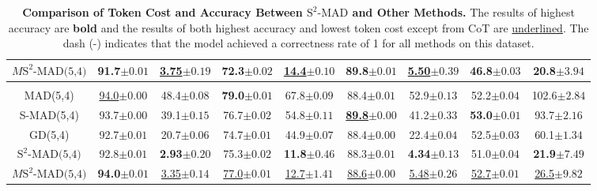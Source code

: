 \begin{table*}[t]
{\begin{tabular}{ccccccccc}
    \({M\text{S}^2\text{-MAD(5,4)}}\) & \textbf{91.7}\scriptsize{$\pm 0.01$} & \underline{3.75}\scriptsize{$\pm 0.19$}          & \textbf{72.3}\scriptsize{$\pm 0.02$} & \underline{14.4}\scriptsize{$\pm 0.10$}         & \textbf{89.8}\scriptsize{$\pm 0.01$} & \underline{5.50}\scriptsize{$\pm 0.39$}                & \textbf{46.8}\scriptsize{$\pm 0.03$} & \textbf{20.8}\scriptsize{$\pm 3.94$} \\
    \midrule
    \rowcolor{Gray}
    \multicolumn{9}{c}{\texttt{GPT-4o-0806}} 
    \\
    \midrule
    MAD(5,4)                 & \underline{94.0}\scriptsize{$\pm 0.00$} & 48.4\scriptsize{$\pm 0.08$}          & \textbf{79.0}\scriptsize{$\pm 0.01$} & 67.8\scriptsize{$\pm 0.09$}        & 88.4\scriptsize{$\pm 0.01$} & 52.9\scriptsize{$\pm 0.13$}                & 52.2\scriptsize{$\pm 0.04$} & 102.6\scriptsize{$\pm 2.84$}                    \\ 
    S-MAD(5,4)                 & 93.7\scriptsize{$\pm 0.00$} & 39.1\scriptsize{$\pm 0.15$}          & 76.7\scriptsize{$\pm 0.02$}  & 54.8\scriptsize{$\pm 0.11$}        & \underline{\textbf{89.8}}\scriptsize{$\pm 0.00$} & 41.2\scriptsize{$\pm 0.33$}                 & \textbf{53.0}\scriptsize{$\pm 0.01$} & 93.7\scriptsize{$\pm 2.16$}                    \\ 
    GD(5,4)                  & 92.7\scriptsize{$\pm 0.01$} & 20.7\scriptsize{$\pm 0.06$}           & 74.7\scriptsize{$\pm 0.01$} & 44.9\scriptsize{$\pm 0.07$}         & 88.4\scriptsize{$\pm 0.00$} & 22.4\scriptsize{$\pm 0.04$}                & 52.5\scriptsize{$\pm 0.03$} & 60.1\scriptsize{$\pm 1.34$}
     \\
    \({\text{S}^2\text{-MAD(5,4)}}\)                  & 92.8\scriptsize{$\pm 0.01$} & \textbf{2.93}\scriptsize{$\pm 0.20$}          & 75.3\scriptsize{$\pm 0.02$} & \textbf{11.8}\scriptsize{$\pm 0.46$}         & 88.3\scriptsize{$\pm 0.01$} & \textbf{4.34}\scriptsize{$\pm 0.13$}                & 51.0\scriptsize{$\pm 0.04$} & \textbf{21.9}\scriptsize{$\pm 7.49$}                 \\
    \({M\text{S}^2\text{-MAD(5,4)}}\) & \textbf{94.0}\scriptsize{$\pm 0.01$} & \underline{3.35}\scriptsize{$\pm 0.14$}          & \underline{77.0}\scriptsize{$\pm 0.01$} & \underline{12.7}\scriptsize{$\pm 1.41$}         & \underline{88.6}\scriptsize{$\pm 0.00$} & \underline{5.48}\scriptsize{$\pm 0.26$}                & \underline{52.7}\scriptsize{$\pm 0.01$} & \underline{26.5}\scriptsize{$\pm 9.82$} \\
    \bottomrule
    \end{tabular}
    }
    \caption{\textbf{Comparison of Token Cost and Accuracy Between \({\text{S}^2\text{-MAD}}\) and Other Methods.} The results of highest accuracy are \textbf{bold} and the results of both highest accuracy and lowest token cost except from CoT are \underline{underlined}. The dash (-) indicates that the model achieved a correctness rate of 1 for all methods on this dataset.}
\label{tab:comparison_add}
\end{table*}

